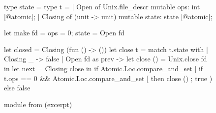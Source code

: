 \begin{figure}[tp]
\begin{ocamlcode}
type state =                             type t =
  | Open of Unix.file_descr                { mutable ops: int [@atomic];
  | Closing of (unit -> unit)                mutable state: state [@atomic]; }            

let make fd = { ops = 0; state = Open fd }

let closed = Closing (fun () -> ())
let close t =
  match t.state with
  | Closing _ -> false
  | Open fd as prev ->
      let close () = Unix.close fd in
      let next = Closing close in
      if Atomic.Loc.compare_and_set [%
        if t.ops == 0
        && Atomic.Loc.compare_and_set [%
        then close () ;
        true
      ) else false
\end{ocamlcode}
\caption{ module from \Eio (excerpt)}
\label{fig:rcfd}
\end{figure}

